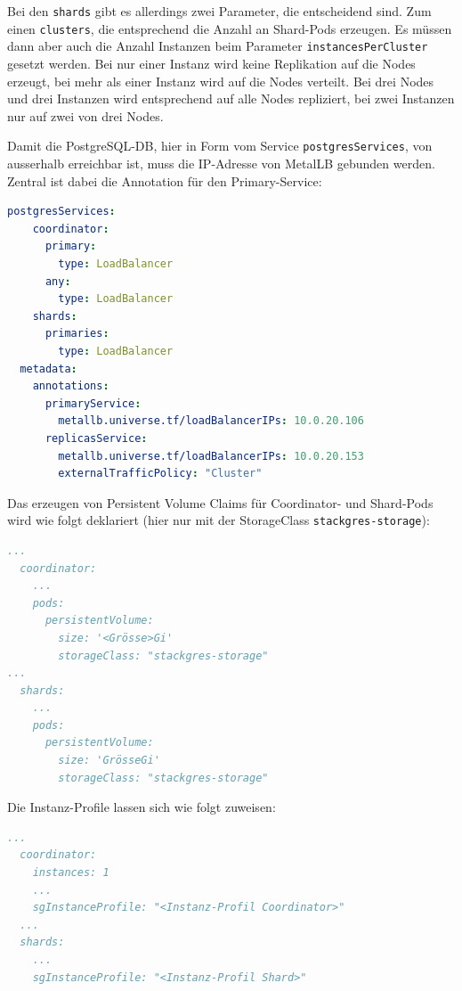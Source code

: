 \begin{flushleft}
    Bei den \texttt{shards} gibt es allerdings zwei Parameter, die entscheidend sind.
    Zum einen \texttt{clusters}, die entsprechend die Anzahl an Shard-Pods erzeugen.
    Es müssen dann aber auch die Anzahl Instanzen beim Parameter \texttt{instancesPerCluster} gesetzt werden.
    Bei nur einer Instanz wird keine Replikation auf die Nodes erzeugt, bei mehr als einer Instanz wird auf die Nodes verteilt.
    Bei drei Nodes und drei Instanzen wird entsprechend auf alle Nodes repliziert, bei zwei Instanzen nur auf zwei von drei Nodes.
\end{flushleft}
\begin{flushleft}
    Damit die PostgreSQL-DB, hier in Form vom Service \texttt{postgresServices}, von ausserhalb erreichbar ist, muss die IP-Adresse von \Gls{MetalLB} gebunden werden.
    Zentral ist dabei die Annotation für den Primary-Service:
\lstset{style=gra_codestyle}
\begin{lstlisting}[language=yaml, caption=StackGres-Citus - LoadBalancer -Annotation,captionpos=b,label={lst:stackgres-citus-loadbalancer-annotation},breaklines=true]
  postgresServices:
    coordinator:
      primary:
        type: LoadBalancer
      any:
        type: LoadBalancer
    shards:
      primaries:
        type: LoadBalancer
  metadata:
    annotations:
      primaryService:
        metallb.universe.tf/loadBalancerIPs: 10.0.20.106
      replicasService:
        metallb.universe.tf/loadBalancerIPs: 10.0.20.153
        externalTrafficPolicy: "Cluster"
\end{lstlisting}
\end{flushleft}
\begin{flushleft}
    Das erzeugen von Persistent Volume Claims für Coordinator- und Shard-Pods wird wie folgt deklariert (hier nur mit der StorageClass \texttt{stackgres-storage}):
\lstset{style=gra_codestyle}
\begin{lstlisting}[language=yaml, caption=StackGres-Citus - StorageClass -PVC Binding,captionpos=b,label={lst:stackgres-citus-storageclass-pvc},breaklines=true]
...
  coordinator:
    ...
    pods:
      persistentVolume:
        size: '<Grösse>Gi'
        storageClass: "stackgres-storage"
...
  shards:
    ...
    pods:
      persistentVolume:
        size: 'GrösseGi'
        storageClass: "stackgres-storage"
\end{lstlisting}
\end{flushleft}
\begin{flushleft}
    Die Instanz-Profile lassen sich wie folgt zuweisen:
\lstset{style=gra_codestyle}
\begin{lstlisting}[language=yaml, caption=StackGres-Citus - Instanz-Profile, captionpos=b,label={lst:stackgres-citus-sginstanceprofile},breaklines=true]
  ...
  coordinator:
    instances: 1
    ...
    sgInstanceProfile: "<Instanz-Profil Coordinator>"
  ...
  shards:
    ...
    sgInstanceProfile: "<Instanz-Profil Shard>"
\end{lstlisting}
\end{flushleft}
